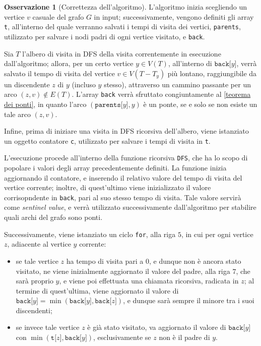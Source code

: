 \documentclass[14pt]{extreport}
\theoremstyle{definition}
\theoremstyle{definition}
\newtheorem{remark}{Osservazione}[subsection]
\begin{document}
\begin{remark}[Correttezza dell'algoritmo]
    L'algoritmo inizia scegliendo un vertice $v$ casuale del grafo $G$ in input; successivamente, vengono definiti gli array \texttt{t}, all'interno del quale verranno salvati i tempi di visita dei vertici, \texttt{parents}, utilizzato per salvare i nodi padri di ogni vertice visitato, e \texttt{back}.

    Sia $T$ l'albero di visita in DFS della visita correntemente in esecuzione dall'algoritmo; allora, per un certo vertice $y \in V(T)$, all'interno di $\texttt{back[}y\texttt{]}$, verrà salvato il tempo di visita del vertice $v \in V(T - T_y)$ più lontano, raggiungibile da un discendente $z$ di $y$ (incluso $y$ stesso), attraverso un cammino passante per un arco $(z, v) \notin E(T)$. L'array \texttt{back} verrà sfruttato congiuntamente al \cref{teorema dei ponti}, in quanto l'arco $(\texttt{parents[}y\texttt{]}, y)$ è un ponte, se e solo se non esiste un tale arco $(z, v)$.

    Infine, prima di iniziare una visita in DFS ricorsiva dell'albero, viene istanziato un oggetto contatore \texttt{c}, utilizzato per salvare i tempi di visita in \texttt{t}.

    L'esecuzione procede all'interno della funzione ricorsiva \texttt{DFS}, che ha lo scopo di popolare i valori degli array precedentemente definiti. La funzione inizia aggiornando il contatore, e inserendo il relativo valore del tempo di visita del vertice corrente; inoltre, di quest'ultimo viene inizializzato il valore corrisopndente in \texttt{back}, pari al suo stesso tempo di visita. Tale valore servirà come \textit{sentinel value}, e verrà utilizzato successivamente dall'algoritmo per stabilire quali archi del grafo sono ponti.

    Successivamente, viene istanziato un ciclo \texttt{for}, alla riga $5$, in cui per ogni vertice $z$, adiacente al vertice $y$ corrente:
    \begin{itemize}
        \item se tale vertice $z$ ha tempo di visita pari a $0$, e dunque non è ancora stato visitato, ne viene inizialmente aggiornato il valore del padre, alla riga $7$, che sarà proprio $y$, e viene poi effettuata una chiamata ricorsiva, radicata in $z$; al termine di quest'ultima, viene aggiornato il valore di $\texttt{back[}y\texttt{]} = \min(\texttt{back[}y\texttt{]}, \texttt{back[}z\texttt{]})$, e dunque sarà sempre il minore tra i suoi discendenti;
        \item se invece tale vertice $z$ è già stato visitato, va aggiornato il valore di $\texttt{back[}y\texttt{]}$ con $\min(\texttt{t[}z\texttt{]}, \texttt{back[}y\texttt{]})$, esclusivamente se $z$ non è il padre di $y$.
    \end{itemize}


\end{remark}
\end{document}
